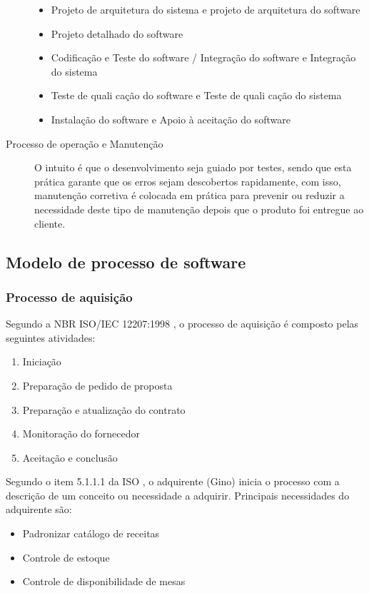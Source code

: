 \begin{description}
\begin{itemize}
    \item Projeto de arquitetura do sistema e projeto de arquitetura do software
    \item Projeto detalhado do software
    \item Codificação e Teste do software / Integração do software e Integração do sistema
    \item Teste de quali cação do software e Teste de quali cação do sistema
    \item Instalação do software e Apoio à aceitação do software
  \end{itemize}
  \item [Processo de operação e Manutenção] O intuito é que o desenvolvimento seja guiado por testes, sendo que esta prática garante que os erros sejam descobertos rapidamente, com isso, manutenção corretiva é colocada em prática para prevenir ou reduzir a necessidade deste tipo de manutenção depois que o produto foi entregue ao cliente. 
\end{description}

\subsection{Modelo de processo de software}

\subsubsection{\large{Processo de aquisição}}

Segundo a NBR ISO/IEC 12207:1998 \cite{iso12207:95}, o processo de aquisição é composto pelas seguintes atividades:

\begin{enumerate}
  \item Iniciação
  \item Preparação de pedido de proposta
  \item Preparação e atualização do contrato
  \item Monitoração do fornecedor
  \item Aceitação e conclusão
\end{enumerate}

Segundo o item 5.1.1.1 da ISO \cite{iso12207:95}, o adquirente (Gino) inicia o processo com a
descrição de um conceito ou necessidade a adquirir. Principais necessidades do adquirente são:

\begin{itemize}
  \item Padronizar catálogo de receitas
  \item Controle de estoque
  \item Controle de disponibilidade de mesas
\end{itemize}

